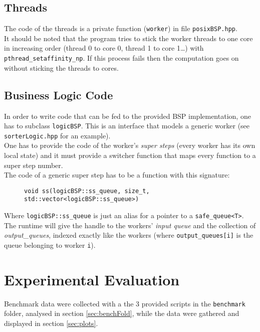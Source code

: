 \documentclass[]{article}
\def\code#1{\texttt{#1}}
\begin{document}
\subsection{Threads}
The code of the threads is a private function (\code{worker}) in file \code{posixBSP.hpp}. \\
It should be noted that the program tries to stick the worker threads to one core in increasing order (thread 0 to core 0, thread 1 to core 1\dots) with \code{pthread\_setaffinity\_np}. If this process fails then the computation goes on without sticking the threads to cores.


\subsection{Business Logic Code}
\label{sec:business}
In order to write code that can be fed to the provided BSP implementation, one has to subclass \code{logicBSP}. This is an interface that models a generic worker (see \code{sorterLogic.hpp} for an example). \\

One has to provide the code of the worker's \emph{super steps} (every worker has its own local state) and it must provide a switcher function that maps every function to a super step number. \\
The code of a generic super step has to be a function with this signature: 
\begin{figure}[H]
	\centering
	\begin{minipage}{0.9\textwidth}		
		\code{void ss(logicBSP::ss\_queue, size\_t, std::vector<logicBSP::ss\_queue>)}
	\end{minipage}
\end{figure}
Where \code{logicBSP::ss\_queue} is just an alias for a pointer to a \code{safe\_queue<T>}. The runtime will give the handle to the workers' \emph{input queue} and the collection of \emph{output\_queues}, indexed exactly like the workers (where \code{output\_queues[i]} is the queue belonging to worker \code{i}).

\section{Experimental Evaluation}
\label{sec:eval}
Benchmark data were collected with a the 3 provided scripts in the \code{benchmark} folder, analysed in section \ref{sec:benchFold}, while the data were gathered and displayed in section \ref{sec:plots}.
\end{document}
